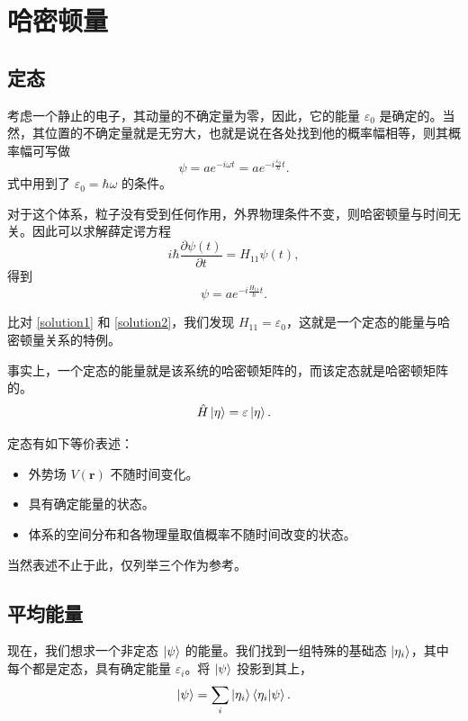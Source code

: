 \documentclass[12pt,a4paper,oneside]{book}
\begin{document}
\chapter{哈密顿量}

\section{定态}

考虑一个静止的电子，其动量的不确定量为零，因此，它的能量 $\varepsilon_0$ 是确定的。当然，其位置的不确定量就是无穷大，也就是说在各处找到他的概率幅相等，则其概率幅可写做
\begin{equation}
    \psi=ae^{-i\omega t}=ae^{-i\frac{\varepsilon_0}{\hbar}t}.\label{solution1}
\end{equation}
式中用到了 $ \varepsilon_0=\hbar\omega $ 的条件。

对于这个体系，粒子没有受到任何作用，外界物理条件不变，则哈密顿量与时间无关。因此可以求解薛定谔方程
\begin{equation}
    i\hbar \frac{\partial \psi(t)}{\partial t}=H_{11}\psi(t),
\end{equation}
得到
\begin{equation}
    \psi=ae^{-i\frac{H_{11}}{\hbar}t}.\label{solution2}
\end{equation}

比对 \ref{solution1} 和 \ref{solution2}，我们发现 $ H_{11}=\varepsilon_0 $，这就是一个定态的能量与哈密顿量关系的特例。

事实上，一个定态的能量就是该系统的哈密顿矩阵的，而该定态就是哈密顿矩阵的。
\begin{equation}
    \hat{H}\ket{\eta}=\varepsilon\ket{\eta}. 
\end{equation}

定态有如下等价表述：
\begin{itemize}
    \item 外势场 $V(\boldsymbol{r})$ 不随时间变化。
    \item 具有确定能量的状态。
    \item 体系的空间分布和各物理量取值概率不随时间改变的状态。
\end{itemize}
当然表述不止于此，仅列举三个作为参考。

\section{平均能量}

现在，我们想求一个非定态 $\ket{\psi}$ 的能量。我们找到一组特殊的基础态 $\ket{\eta_i}$，其中每个都是定态，具有确定能量 $\varepsilon_i$。将 $\ket{\psi}$ 投影到其上，
\begin{equation}
    \ket{\psi}=\sum_i \ket{\eta_i}\braket{\eta_i}{\psi}.
\end{equation}
\end{document}
